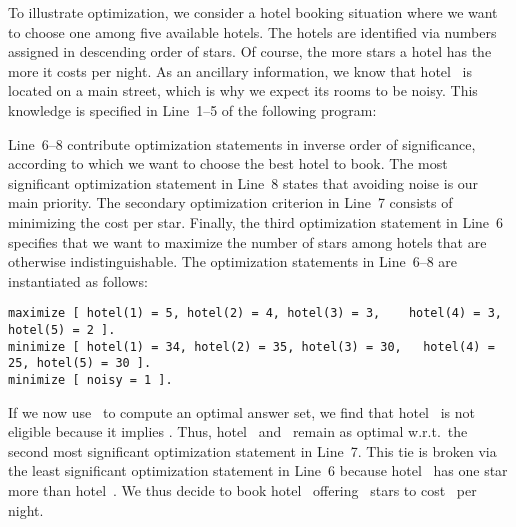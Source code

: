 \begin{example}\label{ex:opt}
To illustrate optimization, we consider a hotel booking situation
where we want to choose one among five available hotels.
The hotels are identified via numbers assigned in descending order of stars.
Of course, the more stars a hotel has the more it costs per night.
As an ancillary information, we know that hotel~ is located
on a main street, which is why we expect its rooms to be noisy.
This knowledge is specified in Line~1--5 of the following program:
%

%
Line~6--8 contribute optimization statements in inverse order of significance,
according to which we want to choose the best hotel to book.
The most significant optimization statement in Line~8 states that
avoiding noise is our main priority.
The secondary optimization criterion in Line~7 consists of
minimizing the cost per star.
Finally, the third optimization statement in Line~6 specifies that we want
to maximize the number of stars among hotels that are otherwise indistinguishable.
The optimization statements in Line~6--8 are instantiated as follows:%
%
\begin{lstlisting}[firstnumber=6,breaklines,breakindent=48pt]
maximize [ hotel(1) = 5, hotel(2) = 4, hotel(3) = 3,    hotel(4) = 3, hotel(5) = 2 ].
minimize [ hotel(1) = 34, hotel(2) = 35, hotel(3) = 30,   hotel(4) = 25, hotel(5) = 30 ].
minimize [ noisy = 1 ].
\end{lstlisting}
If we now use \clasp\ to compute an optimal answer set,%
we find that hotel~ is not eligible because it implies .
Thus, hotel~ and~ remain as optimal w.r.t.\ the second most
significant optimization statement in Line~7.
This tie is broken via the least significant optimization statement in Line~6
because hotel~ has one star more than hotel~.
We thus decide to book hotel~ offering~ stars
to cost~ per night.
\eexample
\end{example}



